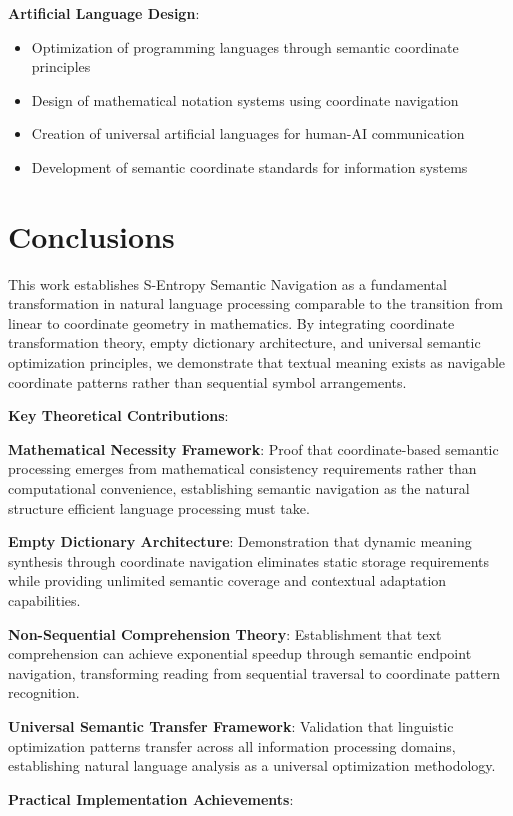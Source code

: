 \documentclass[12pt,a4paper]{article}
\begin{document}
\begin{table}[H]
\textbf{Artificial Language Design}:
\begin{itemize}
\item Optimization of programming languages through semantic coordinate principles
\item Design of mathematical notation systems using coordinate navigation
\item Creation of universal artificial languages for human-AI communication
\item Development of semantic coordinate standards for information systems
\end{itemize}

\section{Conclusions}

This work establishes S-Entropy Semantic Navigation as a fundamental transformation in natural language processing comparable to the transition from linear to coordinate geometry in mathematics. By integrating coordinate transformation theory, empty dictionary architecture, and universal semantic optimization principles, we demonstrate that textual meaning exists as navigable coordinate patterns rather than sequential symbol arrangements.

\textbf{Key Theoretical Contributions}:

\textbf{Mathematical Necessity Framework}: Proof that coordinate-based semantic processing emerges from mathematical consistency requirements rather than computational convenience, establishing semantic navigation as the natural structure efficient language processing must take.

\textbf{Empty Dictionary Architecture}: Demonstration that dynamic meaning synthesis through coordinate navigation eliminates static storage requirements while providing unlimited semantic coverage and contextual adaptation capabilities.

\textbf{Non-Sequential Comprehension Theory}: Establishment that text comprehension can achieve exponential speedup through semantic endpoint navigation, transforming reading from sequential traversal to coordinate pattern recognition.

\textbf{Universal Semantic Transfer Framework}: Validation that linguistic optimization patterns transfer across all information processing domains, establishing natural language analysis as a universal optimization methodology.

\textbf{Practical Implementation Achievements}:


\end{table}
\end{document}
